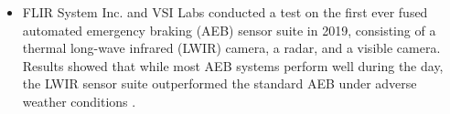 \documentclass[rnd]{mas_proposal}
\begin{document}
\begin{itemize}
      \item FLIR System Inc. \cite{fused_aeb} and VSI Labs \cite{VSILabs} conducted a test on the first ever fused automated emergency braking (AEB) sensor suite in 2019, consisting of a thermal long-wave infrared (LWIR) camera, a radar, and a visible camera. Results showed that while most AEB systems perform well during the day, the LWIR sensor suite outperformed the standard AEB under adverse weather conditions \cite{fused_aeb}.
      

\end{itemize}
\end{document}

